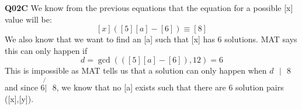 \documentclass[11pt]{article}
\begin{document}
\textbf{Q02C} We know from the previous equations that the equation for a possible [x] value will be:
\[ [x]([5][a] - [6])  \equiv [8] \]
We also know that we want to find an [a] such that [x] has 6 solutions. MAT says this can only happen if
\[ d = \gcd(([5][a] - [6]), 12) = 6 \]
This is impossible as MAT tells us that a solution can only happen when $d\text{ }| \text{ } 8$ and since $6\not{|} \text{ } 8$, we know that no [a] exists such that there are 6 solution pairs ([x],[y]).
\end{document}
